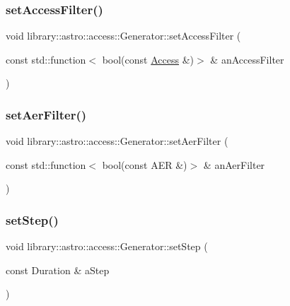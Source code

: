 \subsubsection{\texorpdfstring{set\+Access\+Filter()}{setAccessFilter()}}
{\footnotesize\ttfamily void library\+::astro\+::access\+::\+Generator\+::set\+Access\+Filter (\begin{DoxyParamCaption}\item[{const std\+::function$<$ bool(const \hyperlink{classlibrary_1_1astro_1_1_access}{Access} \&)$>$ \&}]{an\+Access\+Filter }\end{DoxyParamCaption})}

\mbox{\label{classlibrary_1_1astro_1_1access_1_1_generator_a2676ec52653573cf1ff91876f671a679}} 
\subsubsection{\texorpdfstring{set\+Aer\+Filter()}{setAerFilter()}}
{\footnotesize\ttfamily void library\+::astro\+::access\+::\+Generator\+::set\+Aer\+Filter (\begin{DoxyParamCaption}\item[{const std\+::function$<$ bool(const A\+ER \&)$>$ \&}]{an\+Aer\+Filter }\end{DoxyParamCaption})}

\mbox{\label{classlibrary_1_1astro_1_1access_1_1_generator_ac5325bb33fb0cb6fc3e556a5a4eb0934}} 
\subsubsection{\texorpdfstring{set\+Step()}{setStep()}}
{\footnotesize\ttfamily void library\+::astro\+::access\+::\+Generator\+::set\+Step (\begin{DoxyParamCaption}\item[{const Duration \&}]{a\+Step }\end{DoxyParamCaption})}

